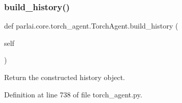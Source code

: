 \subsubsection{\texorpdfstring{build\+\_\+history()}{build\_history()}}
{\footnotesize\ttfamily def parlai.\+core.\+torch\+\_\+agent.\+Torch\+Agent.\+build\+\_\+history (\begin{DoxyParamCaption}\item[{}]{self }\end{DoxyParamCaption})}

\begin{DoxyVerb}Return the constructed history object.\end{DoxyVerb}
 

Definition at line 738 of file torch\+\_\+agent.\+py.



